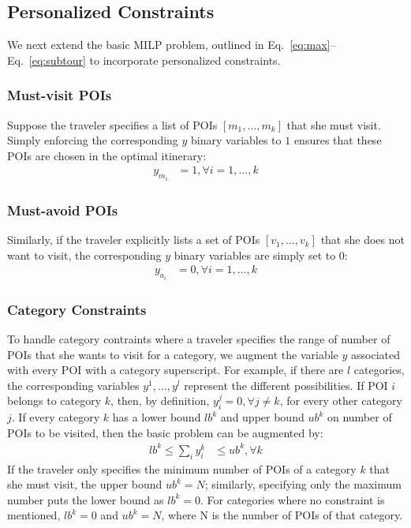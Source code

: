 \subsection{Personalized Constraints}
\label{sec:personalized}

We next extend the basic MILP problem, outlined in Eq.~\eqref{eq:max}--Eq.~\eqref{eq:subtour} to incorporate personalized constraints.

\subsubsection{\textbf{Must-visit POIs}}
\label{sec:must}

Suppose the traveler specifies a list of POIs $[m_1, \dots, m_k]$ that she
must visit.  Simply enforcing the corresponding $y$ binary variables to
$1$ ensures that these POIs are chosen in the optimal itinerary:
%
\begin{align}
	\label{eq:see}
	y_{m_i} & = 1, \forall i = 1, \dots, k
\end{align}

\subsubsection{\textbf{Must-avoid POIs}}
\label{sec:avoid}

Similarly, if the traveler explicitly lists a set of POIs $[v_1, \dots,
v_k]$ that she does not want to visit, the corresponding $y$ binary
variables are simply set to $0$:
%
\begin{align}
	\label{eq:avoid}
	y_{a_i} & = 0, \forall i = 1, \dots, k
\end{align}

\subsubsection{\textbf{Category Constraints}}
\label{sec:category}

To handle category contraints where a traveler specifies the range of
number of POIs that she wants to visit for a category, we augment the
variable $y$ associated with every POI with a category superscript.  For
example, if there are $l$ categories, the corresponding variables $y^1,
\dots, y^l$ represent the different possibilities.  If POI $i$ belongs to
category $k$, then, by definition, $y^j_i = 0, \forall j \neq k$, for
every other category $j$.  If every category $k$ has a lower bound $lb^k$
and upper bound $ub^k$ on number of POIs to be visited, then the basic
problem can be augmented by:
%
\begin{align}
	\label{eq:category}
	lb^k \leq \sum_{i} y^k_i & \leq ub^k, \forall k
\end{align}
%
If the traveler only specifies the minimum number of POIs of a category
$k$ that she must visit, the upper bound $ub^k = N$; similarly, specifying
only the maximum number puts the lower bound as $lb^k = 0$.  For
categories where no constraint is mentioned, $lb^k = 0$ and $ub^k = N$, where N is the number of POIs of that category.

